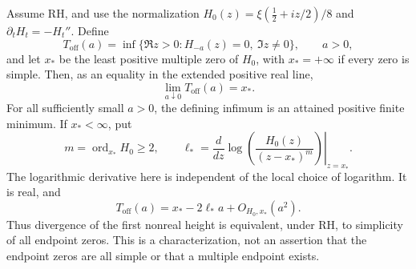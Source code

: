 \begin{corollary}
\label{cor:A051-firstlimit}
Assume RH, and use the normalization
\(H_0(z)=\xi(\tfrac12+iz/2)/8\) and
\(\partial_tH_t=-H_t''\). Define
\[
 T_{\mathrm{off}}(a)=
 \inf\{\Re z>0:H_{-a}(z)=0,\ \Im z\ne0\},\qquad a>0,
\]
and let \(x_*\) be the least positive multiple zero of \(H_0\),
with \(x_*=+\infty\) if every zero is simple.
Then, as an equality in the extended positive real line,
\begin{equation}\label{eq:A051-firstlimit}
                       \lim_{a\downarrow0}T_{\mathrm{off}}(a)=x_*.
\end{equation}
For all sufficiently small \(a>0\), the defining infimum is an
attained positive finite minimum. If \(x_*<\infty\), put
\[
 m=\operatorname{ord}_{x_*}H_0\ge2,\qquad
 \ell_*=\left.\frac{d}{dz}
       \log\!\left(\frac{H_0(z)}{(z-x_*)^m}\right)\right|_{z=x_*}.
\]
The logarithmic derivative here is independent of the local
choice of logarithm. It is real, and
\begin{equation}\label{eq:A051-firstdrift}
                T_{\mathrm{off}}(a)=x_*-2\ell_*a+O_{H_0,x_*}(a^2).
\end{equation}
Thus divergence of the first nonreal height is equivalent, under
RH, to simplicity of all endpoint zeros. This is a characterization,
not an assertion that the endpoint zeros are all simple or that
a multiple endpoint exists.
\end{corollary}

